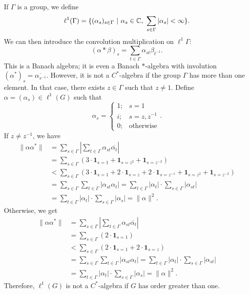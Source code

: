 \begin{example}
  If $\Gamma$ is a group, we define 
  $$\ell^1 (\Gamma) = \{(\alpha_s)_{s \in \Gamma}\ |\ \alpha_s \in \mathbb {C},\ \sum_{s \in \Gamma} |\alpha_s| < \infty\}.$$
  We can then introduce the convolution multiplication on $\ell^1 \Gamma$:
  $$(\alpha * \beta)_s = \sum_{t \in \Gamma} \alpha_{st} \beta_{t^{-1}}.$$
  This is a Banach algebra; it is even a Banach $*$-algebra with involution 
  $(\alpha^*)_s = \overline{\alpha_{s^{-1}}}$. However, it is not a $ C^*$-algebra if the group $\Gamma$ has more than one element. 
  In that case, there exists $z \in \Gamma$ such that $z \neq 1$. Define $\alpha = (\alpha_s) \in \ell^1 (G)$ such that
  $$\alpha_s = \begin{cases}
    1; & s = 1\\
    i; & s = z, z^{-1}\\
    0; &  \textrm{otherwise}
  \end{cases}.$$
  If $z \neq z^{-1}$, we have
  \begin{align*}
    \|\alpha \alpha^*\| &= \sum_{s \in \Gamma} \left| \sum_{t \in \Gamma} \alpha_{st} \overline{\alpha_{t}} \right|\\
    &= \sum_{s \in \Gamma} (3 \cdot \mathbf{1}_{s = 1} + \mathbf{1}_{s = z^2} + \mathbf{1}_{s = z^{-2}})\\
    &< \sum_{s \in \Gamma} (3 \cdot \mathbf{1}_{s = 1} + 2\cdot \mathbf{1}_{s = z} + 2\cdot \mathbf{1}_{s = z^{-1}} + \mathbf{1}_{s = z^2} + \mathbf{1}_{s = z^{-2}})\\
    &= \sum_{s \in \Gamma} \sum_{t \in \Gamma} \left| \alpha_{st} {\alpha_{t}} \right| = \sum_{t \in \Gamma}|{\alpha_{t}}| \cdot \sum_{s \in \Gamma}  \left| \alpha_{st}  \right|\\
    &= \sum_{t \in \Gamma} \left|  {\alpha_{t}} \right| \cdot \sum_{s \in \Gamma} |\alpha_{s}| = \| \alpha\|^2.
  \end{align*}
  Otherwise, we get 
  \begin{align*}
    \|\alpha \alpha^*\| &= \sum_{s \in \Gamma} \left| \sum_{t \in \Gamma} \alpha_{st} \overline{\alpha_{t}} \right|\\
    &= \sum_{s \in \Gamma} (2 \cdot \mathbf{1}_{s = 1})\\
    &< \sum_{s \in \Gamma} (2 \cdot \mathbf{1}_{s = 1} + 2\cdot \mathbf{1}_{s = z} )\\
    &= \sum_{s \in \Gamma} \sum_{t \in \Gamma} \left| \alpha_{st} {\alpha_{t}} \right| = \sum_{t \in \Gamma}|{\alpha_{t}}| \cdot \sum_{s \in \Gamma}  \left| \alpha_{st}  \right|\\
    &= \sum_{t \in \Gamma} \left|  {\alpha_{t}} \right| \cdot \sum_{s \in \Gamma} |\alpha_{s}| = \| \alpha\|^2.
  \end{align*}
  Therefore, $\ell^1 (G)$ is not a $C^*$-algebra if $G$ has order greater than one.
\end{example}

